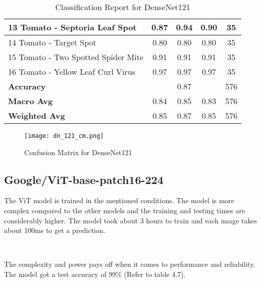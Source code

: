\begin{table}[h!]
{\begin{tabular}{|l|c|c|c|c|}
    13 Tomato - Septoria Leaf Spot                    & 0.87               & 0.94            & 0.90              & 35               \\ \hline
    14 Tomato - Target Spot                           & 0.80               & 0.80            & 0.80              & 35               \\ \hline
    15 Tomato - Two Spotted Spider Mite               & 0.91               & 0.91            & 0.91              & 35               \\ \hline
    16 Tomato - Yellow Leaf Curl Virus                & 0.97               & 0.97            & 0.97              & 35               \\ \hline
    \textbf{Accuracy}                                 & \multicolumn{3}{c|}{0.87}            & 576              \\ \hline
    \textbf{Macro Avg}                                & 0.84               & 0.85            & 0.83              & 576              \\ \hline
    \textbf{Weighted Avg}                             & 0.85               & 0.87            & 0.85              & 576              \\ \hline
    \end{tabular}%
    }
    \caption{Classification Report for DenseNet121}
    \label{tab:classification_report_dn121}
    \end{table}

    \begin{figure}[h!]
        \centering
        \texttt{[image: dn\_121\_cm.png]}
        \caption{Confusion Matrix for DenseNet121}
        \label{fig:dn_121_cm}
    \end{figure}

\subsection{Google/ViT-base-patch16-224}

The ViT model is trained in the mentioned conditions. The model is more complex compared to the other models and the training and testing times are considerably higher. The model took about 3 hours to train and each image takes about 100ms to get a prediction.

\

The complexity and power pays off when it comes to performance and reliability. The model got a test accuracy of 99\% (Refer to table 4.7).

\

